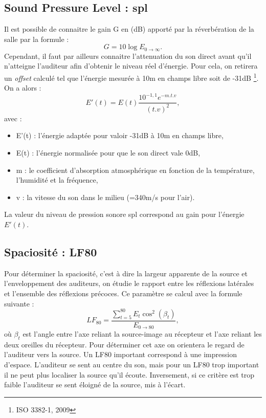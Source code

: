 \subsection{Sound Pressure Level : \gls{spl}}
Il est possible de connaitre le gain \gls{G} en (dB) apporté par la réverbération de la salle par la formule :
\begin{equation}
G =  10\log{E_{0\to\infty}}.
\end{equation}
Cependant, il faut par ailleurs connaitre l'attenuation du son direct avant qu'il n'atteigne l'auditeur afin d'obtenir le niveau réel d'énergie. Pour cela, on retirera un \textit{offset} calculé tel que l'énergie mesurée à 10m en champs libre soit de -31dB \footnote{ISO 3382-1, 2009}. On a alors :
\begin{equation}
E'(t) =  E(t) \frac{ 10^{-1,1}e^{-m.t.v}}{(t.v)^2},
\end{equation}
avec :
\begin{itemize}
	\item E'(t) : l'énergie adaptée pour valoir -31dB à 10m en champs libre,
	\item E(t) : l'énergie normalisée pour que le son direct vale 0dB,
	\item m : le coefficient d'absorption atmosphérique en fonction de la température, l'humidité et la fréquence,
	\item v : la vitesse du son dans le milieu (=340m/s pour l'air).
\end{itemize}
La valeur du niveau de pression sonore \gls{spl} correspond au gain pour l'énergie $E'(t)$. 

\subsection{Spaciosité : \gls{LF80}}
Pour déterminer la spaciosité, c'est à dire la largeur apparente de la source et l'enveloppement des auditeurs, on étudie le rapport entre les réflexions latérales et l'ensemble des réflexions précoces. Ce paramètre se calcul avec la formule suivante :
\begin{equation}
LF_{80} =   \frac{\sum\limits_{t=5}^{80} E_t \cos^2(\beta_t)}{E_{0\to80}}, 
\end{equation}
où $\beta_t$ est l'angle entre l'axe reliant la source-image au récepteur et l'axe reliant les deux oreilles du récepteur. Pour déterminer cet axe on orientera le regard de l'auditeur vers la source.
Un   \gls{LF80}  important  correspond  à  une  impression  d’espace.  L’auditeur  se  sent  au  centre  du  son,  mais  pour  un   \gls{LF80}  trop  important  il  ne  peut  plus  localiser  la  source  qu’il  écoute. Inversement,  si  ce  critère  est  trop  faible  l’auditeur  se  sent  éloigné  de  la  source,  mis  à  l’écart. 



